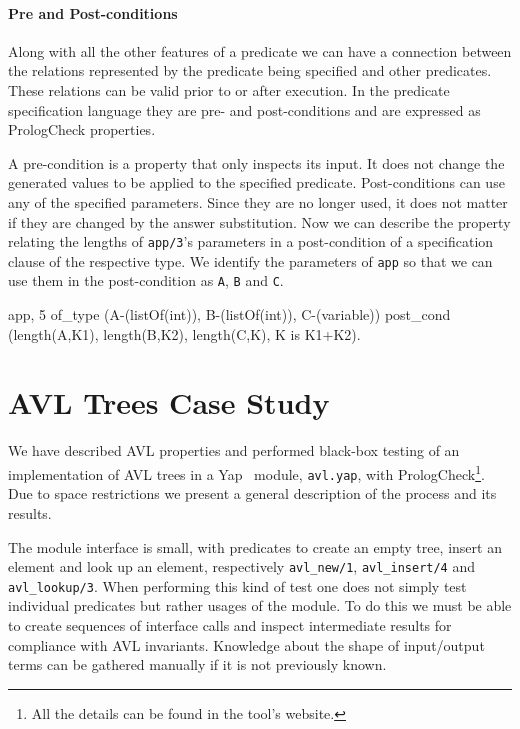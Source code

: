 \documentclass[runningheads,a4paper]{llncs}
\newcommand{\yap}[1]{\lstinline[style=yap]{#1}}
\newcommand{\Yap}[0]{{\sf Yap}}
\newcommand{\plqc}[0]{{\sf PrologCheck}}
\begin{document}
\paragraph{\bf Pre and Post-conditions}

Along with all the other features of a predicate we can have a
connection between the relations represented by the predicate being
specified and other predicates.
%
These relations can be valid prior to or after execution.
%
In the predicate specification language they are pre- and
post-conditions and are expressed as \plqc{} properties.


A pre-condition is a property that only inspects its input.
%
It does not change the generated values to be applied to the specified
predicate.
%
Post-conditions can use any of the specified parameters.
%
Since they are no longer used, it does not matter if they are changed by
the answer substitution.
%
Now we can describe the property relating the lengths of \yap{app/3}'s
parameters in a post-condition of a specification clause of the
respective type.
%
We identify the parameters of \yap{app} so that we can use them in the
post-condition as \yap{A},  \yap{B} and  \yap{C}.
%
\begin{yapcode}
 {app, 5} of_type (A-(listOf(int)), B-(listOf(int)), C-(variable))
   post_cond (length(A,K1), length(B,K2), length(C,K), K is K1+K2).
\end{yapcode}


\section{AVL Trees Case Study}
\label{sec:case-studies}




We have described AVL properties and performed black-box testing of an
implementation of AVL trees in a \Yap{}~\cite{yap} module, \yap{avl.yap}, with
\plqc{}\footnote{All the details can be found in the tool's website.}.
Due to space restrictions we present a general description of the
process and its results. 


The module interface is small, with predicates to create an empty
tree, insert an element and look up an element, respectively
\yap{avl_new/1}, \yap{avl_insert/4} and \yap{avl_lookup/3}.
%
When performing this kind of test one does not simply test individual
predicates but rather usages of the module.
%
To do this we must be able to create sequences of interface
calls and inspect intermediate results for compliance with AVL
invariants.
%
Knowledge about the shape of input/output terms can be gathered manually
if it is not previously known.
\end{document}
